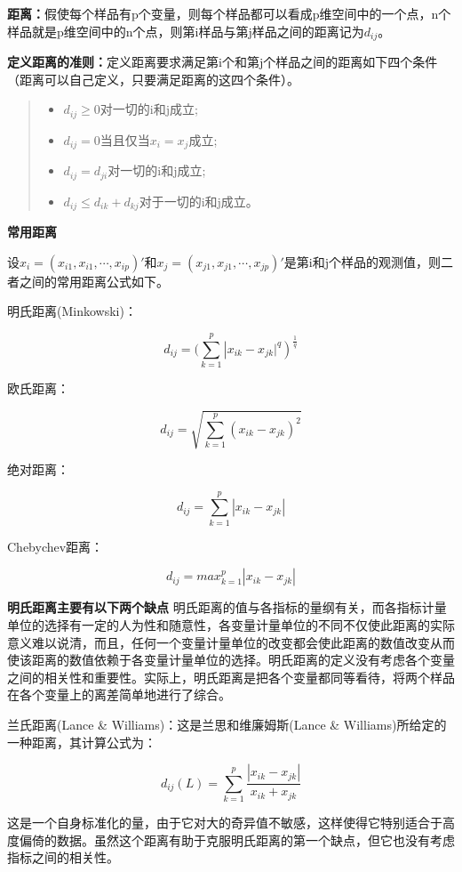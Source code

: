 \documentclass[]{ctexbook}
\providecommand{\tightlist}{%
  \setlength{\itemsep}{0pt}\setlength{\parskip}{0pt}}
\begin{document}
\textbf{距离：}假使每个样品有p个变量，则每个样品都可以看成p维空间中的一个点，n个样品就是p维空间中的n个点，则第i样品与第j样品之间的距离记为\(d_{ij}\)。

\textbf{定义距离的准则：}定义距离要求满足第i个和第j个样品之间的距离如下四个条件（距离可以自己定义，只要满足距离的这四个条件）。

\begin{quote}
\begin{itemize}
\tightlist
\item
  \(d_{ij}\ge 0\)对一切的i和j成立;
\item
  \(d_{ij}=0\)当且仅当\(x_i=x_j\)成立;
\item
  \(d_{ij}=d_{ji}\)对一切的i和j成立;
\item
  \(d_{ij}\le d_{ik}+d_{kj}\)对于一切的i和j成立。
\end{itemize}
\end{quote}

\textbf{常用距离}

设\(x_i=(x_{i1},x_{i1},\cdots,x_{ip})'\)和\(x_j=(x_{j1},x_{j1},\cdots,x_{jp})'\)是第i和j个样品的观测值，则二者之间的常用距离公式如下。

明氏距离(Minkowski)：

\[d_{ij}=(\sum_{k=1}^p \left |x_{ik}-x_{jk}|^q\right)^{\frac{1}{q}}\]

欧氏距离：

\[d_{ij}=\sqrt{\sum_{k=1}^p(x_{ik}-x_{jk})^2}\]

绝对距离：

\[d_{ij}=\sum_{k=1}^p|x_{ik}-x_{jk}|\]

Chebychev距离：

\[d_{ij}=max_{k=1}^p|x_{ik}-x_{jk}|\]

\textbf{明氏距离主要有以下两个缺点}
明氏距离的值与各指标的量纲有关，而各指标计量单位的选择有一定的人为性和随意性，各变量计量单位的不同不仅使此距离的实际意义难以说清，而且，任何一个变量计量单位的改变都会使此距离的数值改变从而使该距离的数值依赖于各变量计量单位的选择。明氏距离的定义没有考虑各个变量之间的相关性和重要性。实际上，明氏距离是把各个变量都同等看待，将两个样品在各个变量上的离差简单地进行了综合。

兰氏距离(Lance \& Williams)：这是兰思和维廉姆斯(Lance \& Williams)所给定的一种距离，其计算公式为：

\[d_{ij}(L)=\sum_{k=1}^p\frac{|x_{ik}-x_{jk}|}{x_{ik}+x_{jk}}\]

这是一个自身标准化的量，由于它对大的奇异值不敏感，这样使得它特别适合于高度偏倚的数据。虽然这个距离有助于克服明氏距离的第一个缺点，但它也没有考虑指标之间的相关性。
\end{document}
